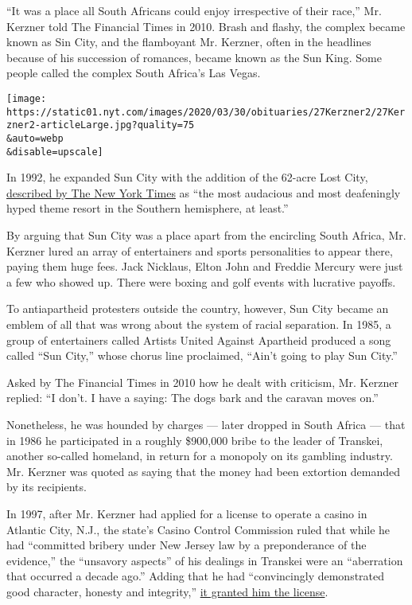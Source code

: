``It was a place all South Africans could enjoy irrespective of their
race,'' Mr. Kerzner told The Financial Times in 2010. Brash and flashy,
the complex became known as Sin City, and the flamboyant Mr. Kerzner,
often in the headlines because of his succession of romances, became
known as the Sun King. Some people called the complex South Africa's Las
Vegas.

\texttt{[image: https://static01.nyt.com/images/2020/03/30/obituaries/27Kerzner2/27Kerzner2-articleLarge.jpg?quality=75\\\&auto=webp\\\&disable=upscale]}

In 1992, he expanded Sun City with the addition of the 62-acre Lost
City,
\href{https://www.nytimes.com/1992/12/03/world/resort-not-too-african-for-rich-tourists.html}{described
by The New York Times} as ``the most audacious and most deafeningly
hyped theme resort in the Southern hemisphere, at least.''

By arguing that Sun City was a place apart from the encircling South
Africa, Mr. Kerzner lured an array of entertainers and sports
personalities to appear there, paying them huge fees. Jack Nicklaus,
Elton John and Freddie Mercury were just a few who showed up. There were
boxing and golf events with lucrative payoffs.

To antiapartheid protesters outside the country, however, Sun City
became an emblem of all that was wrong about the system of racial
separation. In 1985, a group of entertainers called Artists United
Against Apartheid produced a song called ``Sun City,'' whose chorus line
proclaimed, ``Ain't going to play Sun City.''

Asked by The Financial Times in 2010 how he dealt with criticism, Mr.
Kerzner replied: ``I don't. I have a saying: The dogs bark and the
caravan moves on.''

Nonetheless, he was hounded by charges --- later dropped in South Africa
--- that in 1986 he participated in a roughly \$900,000 bribe to the
leader of Transkei, another so-called homeland, in return for a monopoly
on its gambling industry. Mr. Kerzner was quoted as saying that the
money had been extortion demanded by its recipients.

In 1997, after Mr. Kerzner had applied for a license to operate a casino
in Atlantic City, N.J., the state's Casino Control Commission ruled that
while he had ``committed bribery under New Jersey law by a preponderance
of the evidence,'' the ``unsavory aspects'' of his dealings in Transkei
were an ``aberration that occurred a decade ago.'' Adding that he had
``convincingly demonstrated good character, honesty and integrity,''
\href{https://www.nytimes.com/1997/10/23/nyregion/south-african-gets-approval-for-a-casino-in-new-jersey.html}{it
granted him the license}.

